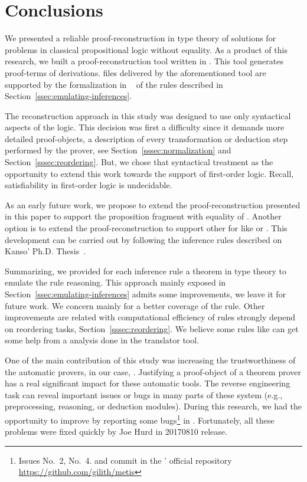 \documentclass[../main.tex]{subfiles}
\begin{document}

\section{Conclusions}
\label{sec:conclusions}

We presented a reliable proof-reconstruction in type theory of \Metis
solutions for problems in classical propositional logic without
equality. As a product of this research, we built a proof-reconstruction tool written in \Haskell. This tool generates
\Agda proof-terms of \Metis \TSTP derivations. \Agda files
delivered by the aforementioned tool are supported by the
formalization in \Agda~\cite{AgdaProp,AgdaMetis} of the \Metis rules
described in Section~\ref{ssec:emulating-inferences}.

The reconstruction approach in this study was designed to use
only syntactical aspects of the logic. This decision was first a
difficulty since it demands more detailed proof-objects, a
description of every transformation or deduction step performed by
the prover, see
Section~\ref{sssec:normalization} and Section~\ref{sssec:reordering}.
But, we chose that syntactical treatment as the opportunity
to extend this work towards the support of first-order logic.
Recall, satisfiability in first-order logic is undecidable.

As an early future work, we propose to extend the
proof-reconstruction presented in this paper to support the
proposition fragment with equality of \Metis.
Another option is to extend the proof-reconstruction to support other \ATPs for \CPL like  or .
This development can be carried out by following the 
inference rules described on Kanso' Ph.D. Thesis~\cite{Kanso2012}.

Summarizing, we provided for each \Metis inference rule a theorem in
type theory to emulate the rule reasoning. This approach mainly
exposed in Section~\ref{ssec:emulating-inferences}
admits some improvements, we leave it for future work. We concern
mainly for a better coverage of the \simplify rule.
Other improvements are related with computational efficiency of
rules strongly depend on reordering tasks,
Section~\ref{sssec:reordering}.
We believe some rules like \canonicalize can get some help from a analysis done in the translator tool.

One of the main contribution of this study was
increasing the trustworthiness of the automatic provers,
in our case, \Metis.
Justifying a proof-object of a theorem prover
has a real significant impact for these automatic tools.
The reverse engineering task can reveal important issues or bugs
in many parts of these system (e.g., preprocessing, reasoning, or
deduction modules). During this research, we had the opportunity
to improve \Metis by reporting some bugs\footnote{Issues No.~2,
No.~4. and commit  in the \Metis' official repository
\url{https://github.com/gilith/metis}} in \Metis.
Fortunately, all these problems were fixed quickly by Joe Hurd in
20170810 release.
\end{document}
